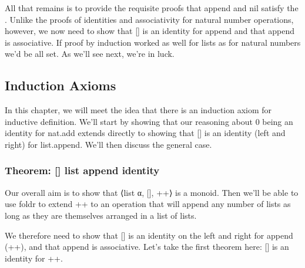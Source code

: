 \documentclass[letterpaper,10pt,english]{sphinxmanual}
\begin{document}
\sphinxAtStartPar
All that remains is to provide the requisite proofs that
append and nil satisfy the . Unlike the proofs
of identities and associativity for natural number operations,
however, we now need to show that {[}{]} is an identity for 
append and that append is associative. If proof by induction
worked as well for lists as for natural numbers we’d be all
set. As we’ll see next, we’re in luck.


\subsection{Induction Axioms}
\label{\detokenize{A_03_Recursive_Types:induction-axioms}}
\sphinxAtStartPar
In this chapter, we will meet the idea that there is
an induction axiom for  inductive definition.
We’ll start by showing that our reasoning about 0
being an identity for nat.add extends directly to
showing that {[}{]} is an identity (left and right) for
list.append. We’ll then discuss the general case.


\subsubsection{Theorem: {[}{]} list append identity}
\label{\detokenize{A_03_Recursive_Types:theorem-list-append-identity}}
\sphinxAtStartPar
Our overall aim is to show that ⟨list α, {[}{]}, ++⟩ is
a monoid. Then we’ll be able to use foldr to extend
++ to an operation that will append any number of
lists as long as they are themselves arranged in a
list of lists.

\sphinxAtStartPar
We therefore need to show that {[}{]} is an identity on
the left and right for append (++), and that append
is associative. Let’s take the first theorem here:
{[}{]} is an identity for ++.
\end{document}
